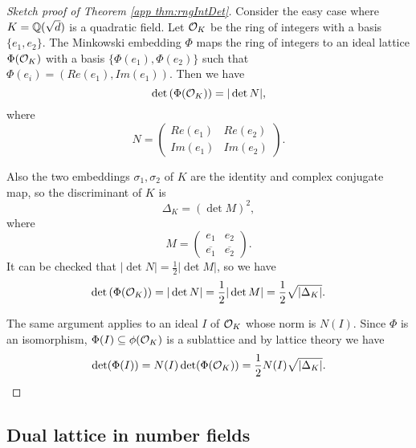 \documentclass[../main.tex]{subfiles}
\begin{document}
\begin{proof}[Sketch proof of Theorem \ref{app thm:rngIntDet}]
Consider the easy case where $K = \mathbb{Q}(\sqrt{d})$ is a quadratic field. Let $\mathcal{O}_K$ be the ring of integers with a basis $\{e_1, e_2\}$. The Minkowski embedding $\Phi$ maps the ring of integers to an ideal lattice $\Phi(\mathcal{O}_K)$ with a basis $\{\Phi(e_1), \Phi(e_2)\}$ such that $\Phi(e_i) = (Re(e_1), Im(e_1))$. Then we have 
\begin{equation*}
    \det \left(\Phi(\mathcal{O}_K) \right) = |\det N|,
\end{equation*}
where 
\begin{equation*}
N= 
\begin{pmatrix}
Re(e_1) & Re(e_2) \\
Im(e_1) & Im(e_2)
\end{pmatrix}.
\end{equation*}

Also the two embeddings $\sigma_1,\sigma_2$ of $K$ are the identity and complex conjugate map, so the discriminant of $K$ is 
\begin{equation*}
    \Delta_K = (\det M)^2,
\end{equation*}
where 
\begin{equation*}
M= 
\begin{pmatrix}
e_1 & e_2 \\
\overline{e_1} & \overline{e_2}
\end{pmatrix}.
\end{equation*}
It can be checked that $|\det N| = \frac{1}{2}|\det M|$, so we have 
\begin{equation*}
    \det \left(\Phi(\mathcal{O}_K) \right) = |\det N| = \frac{1}{2}|\det M| = \frac{1}{2} \sqrt{|\Delta_K|}.
\end{equation*}

The same argument applies to an ideal $I$ of $\mathcal{O}_K$ whose norm is $N(I)$. Since $\Phi$ is an isomorphism, $\Phi(I) \subseteq \phi(\mathcal{O}_K)$ is a sublattice and by lattice theory we have 
\begin{equation*}
    \det ( \Phi(I)) = N(I) \det(\Phi(\mathcal{O}_K)) = \frac{1}{2} N(I)  \sqrt{|\Delta_K|}.
\end{equation*}

\end{proof}
\fi


\subsection{Dual lattice in number fields}
\label{app subsec:dualLatInNumField}
\end{document}
